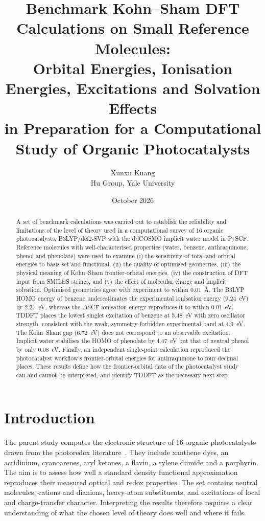 \documentclass[11pt,a4paper]{article}
\title{\textbf{Benchmark Kohn--Sham DFT Calculations on Small Reference Molecules:\\
Orbital Energies, Ionisation Energies, Excitations and Solvation Effects\\
in Preparation for a Computational Study of Organic Photocatalysts}}
\author{Xunxu Kuang\\[2pt]\small Hu Group, Yale University}
\date{October 2026}
\begin{document}
\maketitle

\begin{abstract}
\noindent A set of benchmark calculations was carried out to establish the reliability and
limitations of the level of theory used in a computational survey of 16 organic photocatalysts,
B3LYP/def2-SVP with the ddCOSMO implicit water model in PySCF. Reference molecules with
well-characterised properties (water, benzene, anthraquinone, phenol and phenolate) were used to
examine (i) the sensitivity of total and orbital energies to basis set and functional, (ii) the
quality of optimised geometries, (iii) the physical meaning of Kohn--Sham frontier-orbital
energies, (iv) the construction of DFT input from SMILES strings, and (v) the effect of molecular
charge and implicit solvation. Optimised geometries agree with experiment to within
0.01~\AA. The B3LYP HOMO energy of benzene underestimates the experimental ionisation energy
(9.24~eV) by 2.27~eV, whereas the $\Delta$SCF ionisation energy reproduces it to within
0.01~eV. TDDFT places the lowest singlet excitation of benzene at 5.48~eV with zero oscillator
strength, consistent with the weak, symmetry-forbidden experimental band at 4.9~eV. The Kohn--Sham
gap (6.72~eV) does not correspond to an observable excitation. Implicit water stabilises the
HOMO of phenolate by 4.47~eV but that of neutral phenol by only 0.08~eV. Finally, an independent
single-point calculation reproduced the photocatalyst workflow's frontier-orbital energies for
anthraquinone to four decimal places. These results define how the frontier-orbital data of the
photocatalyst study can and cannot be interpreted, and identify TDDFT as the necessary next step.
\end{abstract}

\section{Introduction}

The parent study computes the electronic structure of 16 organic photocatalysts drawn from the
photoredox literature~\cite{romero2016}. They include xanthene dyes, an acridinium,
cyanoarenes, aryl ketones, a flavin, a rylene diimide and a porphyrin. The aim is to assess how
well a standard density functional approximation reproduces their measured optical and redox
properties. The set contains neutral molecules, cations and dianions, heavy-atom substituents, and
excitations of local and charge-transfer character. Interpreting the results therefore requires a
clear understanding of what the chosen level of theory does well and where it fails.
\end{document}
